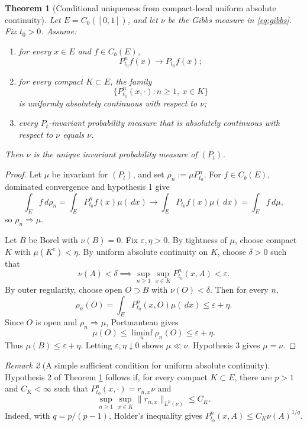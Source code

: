 \documentclass[12pt]{article}
\newcommand{\1}{\mathbf 1}
\newcommand{\dd}{\,d}
\theoremstyle{plain}
\newtheorem{theorem}{Theorem}[section]
\theoremstyle{definition}
\theoremstyle{remark}
\newtheorem{remark}[theorem]{Remark}
\numberwithin{equation}{section}
\begin{document}
\begin{theorem}[Conditional uniqueness from compact-local uniform absolute continuity]\label{thm:uac}
Let \(E=C_0([0,1])\), and let \(\nu\) be the Gibbs measure in
\eqref{eq:gibbs}.  Fix \(t_0>0\).  Assume:
\begin{enumerate}
\item for every \(x\in E\) and \(f\in C_b(E)\),
\[
P_{t_0}^nf(x)\to P_{t_0}f(x);
\]
\item for every compact \(K\subset E\), the family
\[
\{P_{t_0}^n(x,\cdot): n\ge1,\ x\in K\}
\]
is uniformly absolutely continuous with respect to \(\nu\);
\item every \(P_t\)-invariant probability measure that is absolutely continuous
with respect to \(\nu\) equals \(\nu\).
\end{enumerate}
Then \(\nu\) is the unique invariant probability measure of \((P_t)\).
\end{theorem}

\begin{proof}
Let \(\mu\) be invariant for \((P_t)\), and set
\(\rho_n:=\mu P_{t_0}^n\).  For \(f\in C_b(E)\), dominated convergence and
hypothesis 1 give
\[
\int_Ef\dd\rho_n
=
\int_EP_{t_0}^nf(x)\mu(\dd x)
\longrightarrow
\int_EP_{t_0}f(x)\mu(\dd x)
=
\int_Ef\dd\mu,
\]
so \(\rho_n\Rightarrow\mu\).

Let \(B\) be Borel with \(\nu(B)=0\).  Fix \(\varepsilon,\eta>0\).  By tightness
of \(\mu\), choose compact \(K\) with \(\mu(K^c)<\eta\).  By uniform absolute
continuity on \(K\), choose \(\delta>0\) such that
\[
\nu(A)<\delta
\implies
\sup_{n\ge1}\sup_{x\in K}P_{t_0}^n(x,A)<\varepsilon.
\]
By outer regularity, choose open \(O\supset B\) with \(\nu(O)<\delta\).  Then
for every \(n\),
\[
\rho_n(O)
=
\int_EP_{t_0}^n(x,O)\mu(\dd x)
\le
\varepsilon+\eta.
\]
Since \(O\) is open and \(\rho_n\Rightarrow\mu\), Portmanteau gives
\[
\mu(O)\le\liminf_n\rho_n(O)\le\varepsilon+\eta.
\]
Thus \(\mu(B)\le\varepsilon+\eta\).  Letting \(\varepsilon,\eta\downarrow0\)
shows \(\mu\ll\nu\).  Hypothesis 3 gives \(\mu=\nu\).
\end{proof}

\begin{remark}[A simple sufficient condition for uniform absolute continuity]
Hypothesis 2 of Theorem \ref{thm:uac} follows if, for every compact
\(K\subset E\), there are \(p>1\) and \(C_K<\infty\) such that
\(P_{t_0}^n(x,\cdot)=r_{n,x}\nu\) and
\[
\sup_{n\ge1}\sup_{x\in K}\|r_{n,x}\|_{L^p(\nu)}\le C_K.
\]
Indeed, with \(q=p/(p-1)\), Holder's inequality gives
\(P_{t_0}^n(x,A)\le C_K\nu(A)^{1/q}\).
\end{remark}
\end{document}
